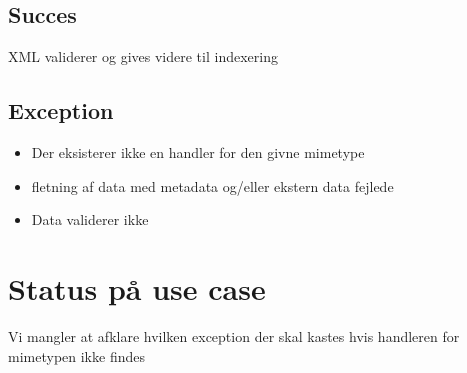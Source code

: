 \documentclass{article}
\begin{document}
\subsection{Succes}
XML validerer og gives videre til indexering

\subsection{Exception}

\begin{itemize}
\item Der eksisterer ikke en handler for den givne mimetype
\item fletning af data med metadata og/eller ekstern data fejlede
\item Data validerer ikke
\end{itemize}


\section{Status på use case}
Vi mangler at afklare hvilken exception der skal kastes hvis handleren for mimetypen ikke findes
\end{document}
